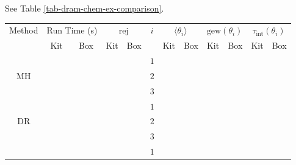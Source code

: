 See Table \ref{tab-dram-chem-ex-comparison}.

\begin{table}[h!]
\begin{center}
\begin{tabular}{|c|c|c|c|c|c|c|c|c|c|c|c|}
\hline
Method & \multicolumn{2}{c|}{Run Time (s)} & \multicolumn{2}{c|}{$\text{rej}$} & $i$ & \multicolumn{2}{c|}{$\langle\theta_i\rangle$} & \multicolumn{2}{c|}{$\text{gew}(\theta_i)$} & \multicolumn{2}{c|}{$\tau_{\text{int}}(\theta_i)$} \\
\cline{2-5}\cline{7-12}
       & Kit            & Box              & Kit           & Box               &     & Kit                  & Box                    & Kit                 & Box                   & Kit                     & Box                      \\
\hline
\hline
       &                &                  &               &                   & $1$ &                      &                        &                     &                       &                         &                          \\
\cline{6-12}
MH     &                &                  &               &                   & $2$ &                      &                        &                     &                       &                         &                          \\
\cline{6-12}
       &                &                  &               &                   & $3$ &                      &                        &                     &                       &                         &                          \\
\hline
       &                &                  &               &                   & $1$ &                      &                        &                     &                       &                         &                          \\
\cline{6-12}
DR     &                &                  &               &                   & $2$ &                      &                        &                     &                       &                         &                          \\
\cline{6-12}
       &                &                  &               &                   & $3$ &                      &                        &                     &                       &                         &                          \\
\hline
       &                &                  &               &                   & $1$ &                      &                        &                     &                       &                         &                          \\

\end{tabular}
\end{center}
\end{table}
